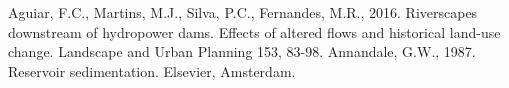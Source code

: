 
\begin{thebibliography}{}
%
%
Aguiar, F.C., Martins, M.J., Silva, P.C., Fernandes, M.R., 2016. Riverscapes downstream of hydropower dams. Effects of altered flows and historical land-use change. Landscape and Urban Planning 153, 83-98.
Annandale, G.W., 1987. Reservoir sedimentation. Elsevier, Amsterdam.
\end{thebibliography}



